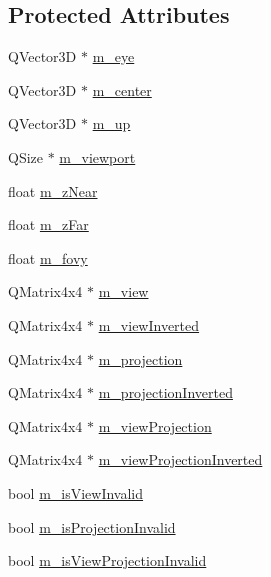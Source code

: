 \subsection*{Protected Attributes}
\begin{DoxyCompactItemize}
\item 
Q\+Vector3\+D $\ast$ \hyperlink{class_camera_a227e5fd463e3bea92f376d8a9d7cee7e}{m\+\_\+eye}
\item 
Q\+Vector3\+D $\ast$ \hyperlink{class_camera_a7048a9ea478532b36678d4d2d07c6dd6}{m\+\_\+center}
\item 
Q\+Vector3\+D $\ast$ \hyperlink{class_camera_af30016ca4d7348e14462f3147add42ec}{m\+\_\+up}
\item 
Q\+Size $\ast$ \hyperlink{class_camera_ac6968a6be1441d8947d3376e983c592e}{m\+\_\+viewport}
\item 
float \hyperlink{class_camera_ae77d866ea9d0aa75853c8243154fca82}{m\+\_\+z\+Near}
\item 
float \hyperlink{class_camera_aa1aaffbfe1f859ff06ae57f7c1faa208}{m\+\_\+z\+Far}
\item 
float \hyperlink{class_camera_ae537e927f6648b6ce7054e0ff54442b9}{m\+\_\+fovy}
\item 
Q\+Matrix4x4 $\ast$ \hyperlink{class_camera_ac11306608e9187c2ff52e0b949cdc5b3}{m\+\_\+view}
\item 
Q\+Matrix4x4 $\ast$ \hyperlink{class_camera_a06be12235980a27d0e529de166117b3e}{m\+\_\+view\+Inverted}
\item 
Q\+Matrix4x4 $\ast$ \hyperlink{class_camera_a23f540bd415235c5b917322e8a333996}{m\+\_\+projection}
\item 
Q\+Matrix4x4 $\ast$ \hyperlink{class_camera_a406e8638e0676defdc5757ed2733e401}{m\+\_\+projection\+Inverted}
\item 
Q\+Matrix4x4 $\ast$ \hyperlink{class_camera_a00e4c0e94057379c97e8c71fd69995f7}{m\+\_\+view\+Projection}
\item 
Q\+Matrix4x4 $\ast$ \hyperlink{class_camera_a29e1c120c55810920954e335eb60e84e}{m\+\_\+view\+Projection\+Inverted}
\item 
bool \hyperlink{class_camera_a07a7666a3529761624675f4f1771f1c7}{m\+\_\+is\+View\+Invalid}
\item 
bool \hyperlink{class_camera_a62264f74f2fb442e8d94e5c0a44098f0}{m\+\_\+is\+Projection\+Invalid}
\item 
bool \hyperlink{class_camera_a34a4ccea1f4f66eb140db34ef7bdf11a}{m\+\_\+is\+View\+Projection\+Invalid}
\end{DoxyCompactItemize}
